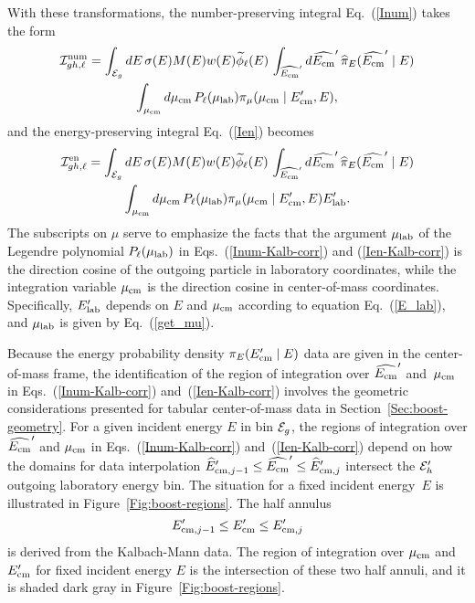 With these transformations, the number-preserving integral Eq.~(\ref{Inum}) 
takes the form
\begin{multline}
   {\cal I}^{\text{num}}_{gh,\ell} =
         \int_{{\cal E}_g} dE \, \sigma ( E ) M(E) w(E) \widetilde \phi_\ell(E) 
       \, \int_{\widehat {E_{\text{cm}}}' } d\widehat {E_{\text{cm}}}' \,
           \widehat \pi_E( \widehat {E_{\text{cm}}}' \mid E) \\
        \int_{\mu_{\text{cm}}} d\mu_{\text{cm}} \,  P_\ell( \mu_{\text{lab}} ) \pi_\mu( \mu_{\text{cm}} \mid E_{\text{cm}}', E ),
  \label{Inum-Kalb-corr}
\end{multline}
and the energy-preserving integral Eq.~(\ref{Ien}) becomes
\begin{multline}
  {\cal I}^{\text{en}}_{gh,\ell} =
        \int_{{\cal E}_g} dE \, \sigma ( E ) M(E) w(E) \widetilde \phi_\ell(E) 
       \, \int_{\widehat {E_{\text{cm}}}' } d\widehat {E_{\text{cm}}}' \,
           \widehat \pi_E( \widehat {E_{\text{cm}}}' \mid E) \\
        \int_{\mu_{\text{cm}}} d\mu_{\text{cm}} \,  P_\ell( \mu_{\text{lab}} ) \pi_\mu( \mu_{\text{cm}} \mid E_{\text{cm}}', E ) E_{\text{lab}}' .
  \label{Ien-Kalb-corr}
\end{multline}
The subscripts on $\mu$ serve to emphasize the facts
that the argument $\mu_{\text{lab}}$ of the Legendre polynomial
$P_\ell( \mu_{\text{lab}} )$ in Eqs.~(\ref{Inum-Kalb-corr}) and (\ref{Ien-Kalb-corr}) is
the direction cosine of the outgoing particle in laboratory coordinates,
while the integration variable $\mu_{\text{cm}}$ is the direction cosine in
center-of-mass coordinates.
Specifically, $E_{\text{lab}}' $ depends on $E$ and $\mu_{\text{cm}}$ according to equation Eq.~(\ref{E_lab}),
and $\mu_{\text{lab}}$ is given by Eq.~(\ref{get_mu}).

Because the energy probability density $\pi_E( E_{\text{cm}}' \mid E)$ data are given
in the center-of-mass frame, the identification of the region of integration
over $\widehat {E_{\text{cm}}}'$ and~$\mu_{\text{cm}}$ in Eqs.~(\ref{Inum-Kalb-corr})
and~(\ref{Ien-Kalb-corr}) involves the geometric considerations
presented for tabular center-of-mass data in Section~\ref{Sec:boost-geometry}.
For a given incident energy $E$ in bin ${\cal E}_g$,
the regions of integration over
$\widehat {E_{\text{cm}}}'$ and $\mu_{\text{cm}}$ in Eqs.~(\ref{Inum-Kalb-corr}) 
and~(\ref{Ien-Kalb-corr}) depend on how the domains for data interpolation
$ \widehat E'_{\text{cm},j-1} \le \widehat {E_{\text{cm}}}' \le \widehat E'_{\text{cm},j}$
 intersect
the  ${\cal E}_h'$ outgoing laboratory energy bin.   
The situation for a fixed incident
energy~$E$ is illustrated in Figure~\ref{Fig:boost-regions}.  
The half annulus
$$
  E'_{\text{cm}, j-1} \le E_{\text{cm}}' \le  E'_{\text{cm}, j}
$$
is derived from the Kalbach-Mann data.  The region of integration 
over $\mu_{\text{cm}}$ and $E_{\text{cm}}'$ for fixed incident energy $E$ is the intersection of
these two half annuli, and it is shaded dark gray in Figure~\ref{Fig:boost-regions}.

